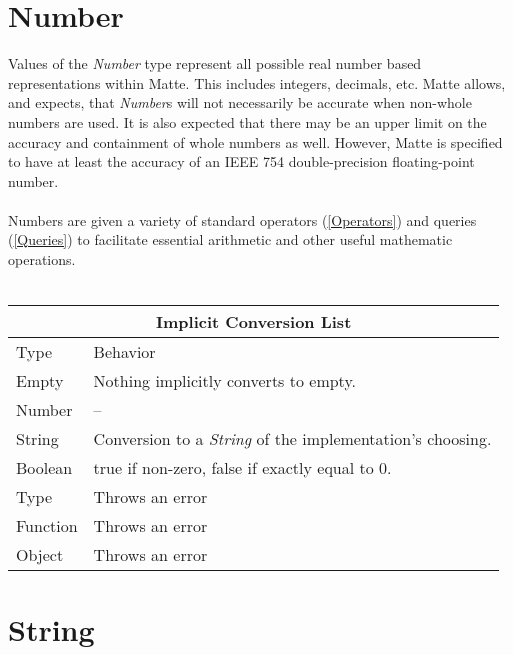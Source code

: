 \documentclass[12pt,letterpaper]{report}
\begin{document}
\section{Number}\label{Number}

Values of the \textit{Number} type represent all possible real number based representations within 
Matte. This includes integers, decimals, etc. Matte allows, and expects, that \textit{Number}s will not 
necessarily be accurate when non-whole numbers are used. It is also expected that there may 
be an upper limit on the accuracy and containment of whole numbers as well. However, Matte is 
specified to have at least the accuracy of an IEEE 754 double-precision floating-point number.
\\\\
Numbers are given a variety of standard operators (\autoref{Operators}) and queries (\autoref{Queries}) to facilitate 
essential arithmetic and other useful mathematic operations.
\\\\
{
\centering
\begin{tabular}{ |p{2.5cm}||p{10cm}|  }
  \hline
  \multicolumn{2}{|c|}{Implicit Conversion List} \\
  \hline
  Type & Behavior\\
  \hline
  Empty & Nothing implicitly converts to empty.\\
  Number  & -- \\
  String & Conversion to a \textit{String} of the implementation's choosing.\\
  Boolean & true if non-zero, false if exactly equal to 0.\\
  Type & Throws an error\\
  Function & Throws an error\\
  Object & Throws an error\\
 \hline
\end{tabular}
}




\section{String}\label{String}
\end{document}
